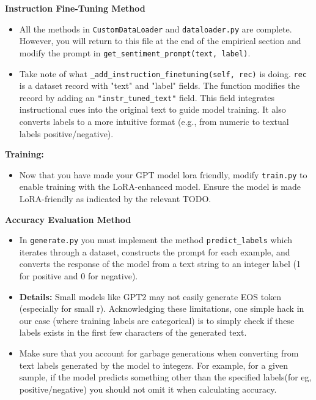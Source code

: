 \documentclass[11pt,addpoints,answers]{exam}
\begin{document}
\begin{questions}
\textbf{Instruction Fine-Tuning Method}
\begin{itemize}
\item All the methods in \lstinline{CustomDataLoader} and \lstinline{dataloader.py} are complete. However, you will return to this file at the end of the empirical section and modify the prompt in \lstinline{get_sentiment_prompt(text, label)}. 
\item Take note of what \lstinline{_add_instruction_finetuning(self, rec)} is doing. \lstinline{rec} is a dataset record with "text" and "label" fields. The function modifies the record by adding an \lstinline{"instr_tuned_text"} field. This field integrates instructional cues into the original text to guide model training. It also converts labels to a more intuitive format (e.g., from numeric to textual labels positive/negative).
\end{itemize}

\textbf{Training:}
\begin{itemize}
    \item Now that you have made your GPT model lora friendly, modify \lstinline{train.py} to enable training with the LoRA-enhanced model. Ensure the model is made LoRA-friendly as indicated by the relevant TODO.
\end{itemize}


\textbf{Accuracy Evaluation Method}

\begin{itemize}
\item In \lstinline{generate.py} you must implement the method \lstinline{predict_labels} which iterates through a dataset, constructs the prompt for each example, and converts the response of the model from a text string to an integer label (1 for positive and 0 for negative).

\item \textbf{Details:} Small models like GPT2 may not easily generate EOS token (especially for small r). Acknowledging these limitations, one simple hack in our case (where training labels are categorical) is to simply check if these labels exists in the first few characters of the generated text. 

\item Make sure that you account for garbage generations when converting from text labels generated by the model to integers. For example, for a given sample, if the model predicts something other than the specified labels(for eg, positive/negative) you should not omit it when calculating accuracy.
\end{itemize}
    

\end{questions}
\end{document}
